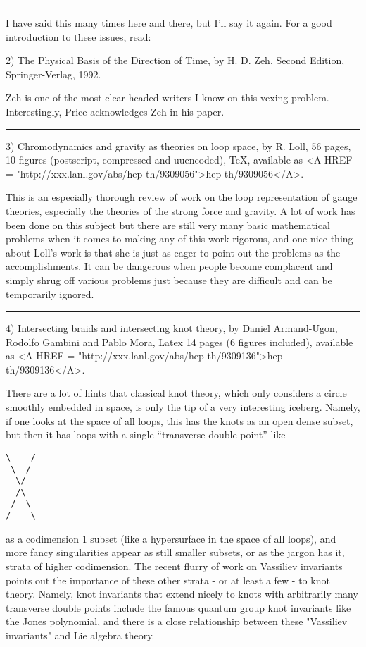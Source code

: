 \par\noindent\rule{\textwidth}{0.4pt}
I have said this many times here and there, but I'll say it again.  For
a good introduction to these issues, read:

2) The Physical Basis of the Direction of Time, by H. D. Zeh, Second
Edition, Springer-Verlag, 1992.

Zeh is one of the most clear-headed writers I know on this vexing
problem.  Interestingly, Price acknowledges Zeh in his paper.

\par\noindent\rule{\textwidth}{0.4pt}

3)  Chromodynamics and gravity as theories on loop space, by R.
Loll, 56 pages, 10 figures (postscript, compressed and uuencoded), TeX,
available as <A HREF = "http://xxx.lanl.gov/abs/hep-th/9309056">hep-th/9309056</A>.

This is an especially thorough review of work on the loop representation
of gauge theories, especially the theories of the strong force and
gravity.  A lot of work has been done on this subject but there are
still very many basic mathematical problems when it comes to making any
of this work rigorous, and one nice thing about Loll's work is that she
is just as eager to point out the problems as the accomplishments.  It
can be dangerous when people become complacent and simply shrug off
various problems just because they are difficult and can be temporarily
ignored.  

\par\noindent\rule{\textwidth}{0.4pt}

4) Intersecting braids and intersecting knot theory, by Daniel Armand-Ugon,
Rodolfo Gambini and Pablo Mora, Latex 14 pages (6 figures included),
available as <A HREF = "http://xxx.lanl.gov/abs/hep-th/9309136">hep-th/9309136</A>. 

There are a lot of hints that classical knot theory, which only
considers a circle smoothly embedded in space, is only the tip of a very
interesting iceberg.  Namely, if one looks at the space of all loops,
this has the knots as an open dense subset, but then it has loops with a
single ``transverse double point'' like

\begin{verbatim}
\    /
 \  /
  \/
  /\
 /  \
/    \
\end{verbatim}
    

as a codimension 1 subset (like a hypersurface in the space of all
loops), and more fancy singularities appear as still smaller subsets, or
as the jargon has it, strata of higher codimension.  The recent flurry
of work on Vassiliev invariants points out the importance of these other
strata - or at least a few - to knot theory.  Namely, knot invariants
that extend nicely to knots with arbitrarily many transverse double
points include the famous quantum group knot invariants like the Jones
polynomial, and there is a close relationship between these "Vassiliev
invariants" and Lie algebra theory.

